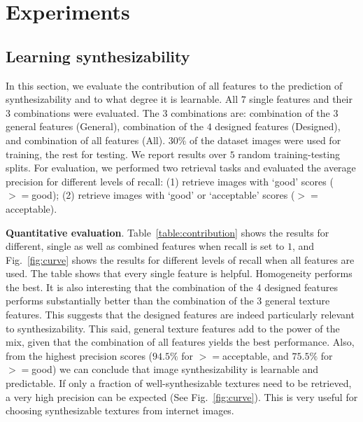 \documentclass[10pt,twocolumn,letterpaper]{article}
\begin{document}

\section{Experiments}
\label{sec:experiment}

\subsection{Learning synthesizability}

In this section, we evaluate the contribution of all features to the
prediction of synthesizability and to what degree it is learnable.
All $7$ single features and their $3$ combinations were
evaluated. The $3$ combinations are: combination of the $3$
general features (General), combination of the $4$ designed features
(Designed), and combination of all features (All).  $30\%$ of the
dataset images were used for training, the rest for testing. We report
results over $5$ random training-testing splits. For evaluation, we
performed two retrieval tasks and evaluated the average precision for
different levels of recall: (1) retrieve images with `good' scores
($>=$good); (2) retrieve images with `good' or `acceptable' scores
($>=$acceptable).


\textbf{Quantitative evaluation}. Table~\ref{table:contribution} shows
the results for different, single as well as combined features when 
recall is set to $1$, and Fig.~\ref{fig:curve} shows the results for 
different levels of recall when all features are used. The table shows 
that every single feature is helpful. Homogeneity performs the best. 
It is also interesting that the combination of the 4 designed features 
performs substantially better than the combination of the 3 general 
texture features. This suggests that the designed features are indeed
particularly relevant to synthesizability. This said, general texture 
features add to the power of the mix, given that the combination of all 
features yields the best performance. Also, from the highest precision 
scores ($94.5\%$ for $>=$acceptable, and $75.5\%$ for $>=$good) we can 
conclude that image synthesizability is learnable and predictable. If 
only a fraction of well-synthesizable textures need to be retrieved, 
a very high precision can be expected (See Fig.~\ref{fig:curve}). This 
is very useful for choosing synthesizable textures from internet images. 
\end{document}
